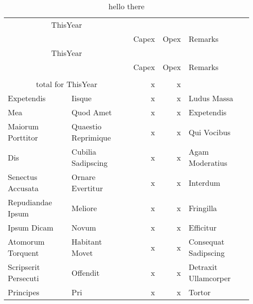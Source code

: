 \documentclass[a4paper]{article}
\begin{document}
    \begin{longtable}{p{40mm}p{20mm}rrp{40mm}}
        \caption{hello there} \\

        \toprule

        \multicolumn{2}{c}{ThisYear} &  &  & \\\cmidrule(lr){1-2}

        &  & Capex & Opex & Remarks\\\midrule

        \endfirsthead
        \toprule

        \multicolumn{2}{c}{ThisYear} &  &  & \\\cmidrule(lr){1-2}

        &  & Capex & Opex & Remarks\\\midrule

        \endhead
        \bottomrule
        \endfoot

        \midrule\\

        \multicolumn{2}{c}{total for ThisYear} & x & x & \\

        \bottomrule
        \endlastfoot


        Expetendis & Iisque & x & x & Ludus Massa\\

        Mea & Quod Amet & x & x & Expetendis\\

        Maiorum Porttitor & Quaestio Reprimique & x & x & Qui Vocibus\\

        Dis & Cubilia Sadipscing & x & x & Agam Moderatius\\

        Senectus Accusata & Ornare Evertitur & x & x & Interdum\\

        Repudiandae Ipsum & Meliore & x & x & Fringilla\\

        Ipsum Dicam & Novum & x & x & Efficitur\\

        Atomorum Torquent & Habitant Movet & x & x & Consequat Sadipscing\\

        Scripserit Persecuti & Offendit & x & x & Detraxit Ullamcorper\\

        Principes & Pri & x & x & Tortor\\


\end{longtable}
\end{document}
